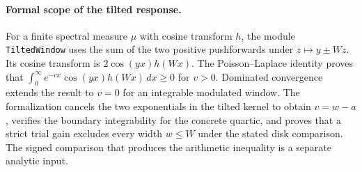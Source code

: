 \paragraph{Formal scope of the tilted response.}
For a finite spectral measure $\mu$ with cosine transform $h$, the
module \texttt{TiltedWindow} uses the sum of the two positive
pushforwards under $z\mapsto y\pm Wz$. Its cosine transform is
$2\cos(yx)h(Wx)$. The Poisson--Laplace identity proves that
$\int_0^\infty e^{-vx}\cos(yx)h(Wx)\,dx\ge0$ for $v>0$.
Dominated convergence extends the result to $v=0$ for an integrable
modulated window. The formalization cancels the two exponentials in
the tilted kernel to obtain $v=w-a$, verifies the boundary
integrability for the concrete quartic, and proves that a strict
trial gain excludes every width $w\le W$ under the stated disk
comparison. The signed comparison that produces the arithmetic
inequality is a separate analytic input.
